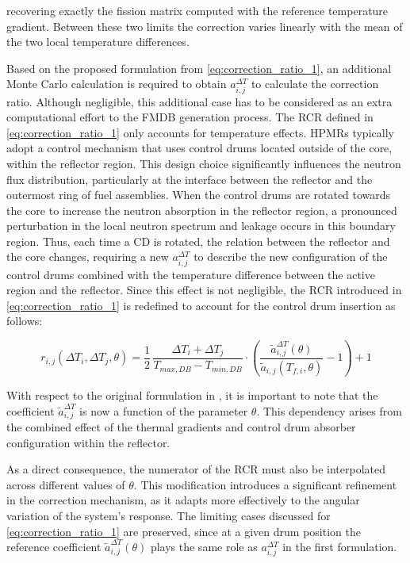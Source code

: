 \documentclass[preprint,review,12pt]{elsarticle}
\newif\ifhighlight
\newcommand{\rtwo}[1]{\ifhighlight\textcolor{revtwo}{#1}\else#1\fi}
\newcommand{\rtwocolor}{\ifhighlight\color{revtwo}\fi}
\begin{document}
\rtwo{recovering exactly the fission matrix computed with the reference temperature gradient. Between these two limits the correction varies linearly with the mean of the two local temperature differences.}

Based on the proposed formulation from \cref{eq:correction_ratio_1}, an additional Monte Carlo calculation is required to obtain $a_{i,j}^{\Delta T}$ to calculate the correction ratio. Although negligible, this additional case has to be considered as an extra computational effort to the FMDB generation process.  
The RCR defined in \cref{eq:correction_ratio_1} only accounts for temperature effects. HPMRs typically adopt a control mechanism that uses control drums located outside of the core, within the reflector region. This design choice significantly influences the neutron flux distribution, particularly at the interface between the reflector and the outermost ring of fuel assemblies. When the control drums are rotated towards the core to increase the neutron absorption in the reflector region, a pronounced perturbation in the local neutron spectrum and leakage occurs in this boundary region. Thus, each time a CD is rotated, the relation between the reflector and the core changes, requiring a new $a_{i,j}^{\Delta T}$ to describe the new configuration of the control drums combined with the temperature difference between the active region and the reflector. 
Since this effect is not negligible, the RCR introduced in \cref{eq:correction_ratio_1} is redefined to account for the control drum insertion as follows:    

\begin{equation}
\rtwocolor r_{i,j}(\Delta T_i, \Delta T_j, \theta) = \frac{1}{2}\,\frac{\Delta T_i + \Delta T_j}{T_{max,DB} - T_{min,DB}} \cdot \left( \frac{ \tilde{a}_{i,j}^{\Delta T}(\theta)}{\tilde{a}_{i,j}(T_{f,i}, \theta)} - 1 \right) + 1
\label{eq:correction_ratio_2}
\end{equation}

With respect to the original formulation in , it is important to note that the coefficient $\tilde{a}_{i,j}^{\Delta T}$ is now a function of the parameter $\theta$. This dependency arises from the combined effect of the thermal gradients and control drum absorber configuration within the reflector.

As a direct consequence, the numerator of the RCR must also be interpolated across different values of $\theta$. This modification introduces a significant refinement in the correction mechanism, as it adapts more effectively to the angular variation of the system's response. \rtwo{The limiting cases discussed for \cref{eq:correction_ratio_1} are preserved, since at a given drum position the reference coefficient $\tilde{a}_{i,j}^{\Delta T}(\theta)$ plays the same role as $a_{i,j}^{\Delta T}$ in the first formulation.}
\end{document}
